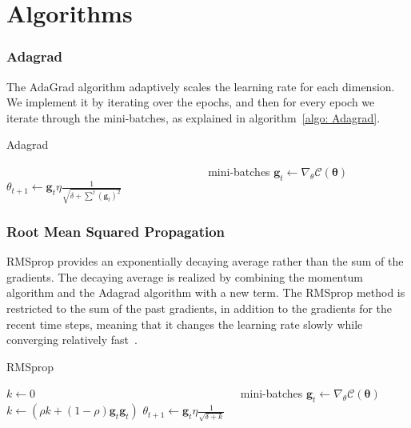 \documentclass[english,notitlepage,reprint,nofootinbib]{revtex4-2}  %
\begin{document}
\section{Algorithms}\label{app: algos}
\subsubsection*{Adagrad} %
The AdaGrad algorithm adaptively scales the learning rate for each dimension. We implement it by iterating over the epochs, and then for every epoch we iterate through the mini-batches, as explained in algorithm~\ref{algo: Adagrad}. %

\begin{algorithm}[H]
    \caption{Adagrad}\label{algo: Adagrad}
    \begin{algorithmic}
         
        \State $\:\:\:\:\:\:\:\:\:\:\:\:\:\:\:\:\:\:\:\:\:\:\:\:\:\:\:\:\:\:\:\:\:\:\:\:\:\:\:\:\:\:\:\:\:\:\:\:\:\:\:\:\:\:\:\:\:\:\:\:\:\:\:\:\:\:\:\:\:\:\:\:\:\:\:\:\:\:\:\:$ mini-batches
        \State $\mathbf{g}_t \leftarrow \nabla_\theta \mathcal{C}(\boldsymbol{\theta})$ 
        \State $\theta_{t+1} \leftarrow \mathbf{g}_t \eta \frac{1}{\sqrt{\delta+ \sum^t(\mathbf{g}_t)^2}}$
    \end{algorithmic}
\end{algorithm}

\subsubsection*{Root Mean Squared Propagation}
RMSprop provides an exponentially decaying average rather than the sum of the gradients. The decaying average is realized by combining the momentum algorithm and the Adagrad algorithm with a new term. The RMSprop method is restricted to the sum of the past gradients, in addition to the gradients for the recent time steps, meaning that it changes the learning rate slowly while converging relatively fast~\cite{lecture_notes}. 

\begin{algorithm}[H]
    \caption{RMSprop}\label{algo: RMSprop}
    \begin{algorithmic}
         
        \State $k \leftarrow 0$
        \State $\:\:\:\:\:\:\:\:\:\:\:\:\:\:\:\:\:\:\:\:\:\:\:\:\:\:\:\:\:\:\:\:\:\:\:\:\:\:\:\:\:\:\:\:\:\:\:\:\:\:\:\:\:\:\:\:\:\:\:\:\:\:\:\:\:\:\:\:\:\:\:\:\:\:\:\:\:\:\:\:$ mini-batches
        \State $\mathbf{g}_t \leftarrow \nabla_\theta \mathcal{C}(\boldsymbol{\theta})$
        \State $k \leftarrow (\rho k + (1 - \rho)\mathbf{g}_t \mathbf{g}_t)$
        \State $\theta_{t+1} \leftarrow \mathbf{g}_t \eta \frac{1}{\sqrt{\delta + k}}$
    \end{algorithmic}
\end{algorithm}
\end{document}
